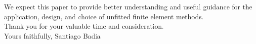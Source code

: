 \documentclass[a4paper,11pt,twoside]{article}
\begin{document}
We expect this paper to provide better understanding and useful
guidance for the application, design, and choice of unfitted finite element methods.\\

Thank you for your valuable time and consideration. \\

Yours faithfully,
\vspace{0.6cm}
\vskip0.6cm
Santiago Badia

\label{sec:endpage}
\end{document}
